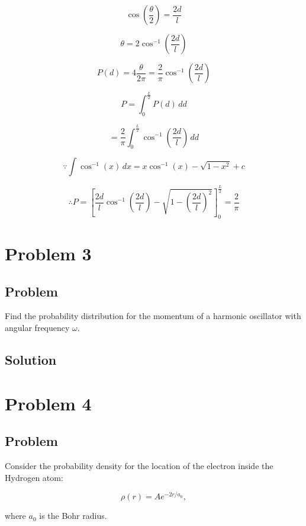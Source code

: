 \documentclass[12pt]{article}
\begin{document}
\[
    \cos{\left(\frac{\theta}{2}\right)} = \frac{2d}{l}
\]


\[
    \theta = 2\cos^{-1}{\left(\frac{2d}{l}\right)}
\]


\[
    P(d) = 4\frac{\theta}{2\pi} = \frac{2}{\pi}\cos^{-1}{\left(\frac{2d}{l}\right)}
\]

\[
    P = \int^{\frac{L}{2}}_{0}P(d)\,dd
\]

\[
    = \frac{2}{\pi}\int^{\frac{L}{2}}_{0}\cos^{-1}{\left(\frac{2d}{l}\right)}\,dd
\]

\[
    \because \int{\cos^{-1}{(x)}\,dx} = x \cos^{-1}{(x)}-\sqrt{1-x^2} + c
\]

\[
    \therefore P = \left[\frac{2d}{l} \cos^{-1}{(\frac{2d}{l})}-\sqrt{1-{\left(\frac{2d}{l}\right)}^2}\right]^\frac{L}{2}_0 = \frac{2}{\pi}
\]

\newpage

\section{Problem 3}

\subsection{Problem}

Find the probability distribution for the momentum of a harmonic oscillator with angular frequency $\omega $.

\subsection{Solution}

\newpage

\section{Problem 4}

\subsection{Problem}

Consider the probability density for the location of the electron inside the Hydrogen atom:

\begin{equation}
    \rho(r)=A e^{-2 r / a_{0}},
\end{equation}

where $a_{0}$ is the Bohr radius.
\end{document}
